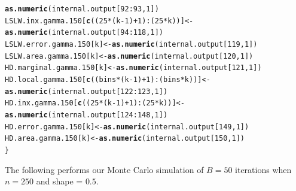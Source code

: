 \documentclass[11pt]{article}\usepackage[]{graphicx}\usepackage[]{color}
\makeatletter
\newcommand{\hlnum}[1]{\textcolor[rgb]{0.686,0.059,0.569}{#1}}%
\newcommand{\hlopt}[1]{\textcolor[rgb]{0,0,0}{#1}}%
\newcommand{\hlstd}[1]{\textcolor[rgb]{0.345,0.345,0.345}{#1}}%
\newcommand{\hlkwb}[1]{\textcolor[rgb]{0.69,0.353,0.396}{#1}}%
\newcommand{\hlkwd}[1]{\textcolor[rgb]{0.737,0.353,0.396}{\textbf{#1}}}%
\newenvironment{kframe}{%
 \def\at@end@of@kframe{}%
 \ifinner\ifhmode%
  \def\at@end@of@kframe{\end{minipage}}%
  \begin{minipage}{\columnwidth}%
 \fi\fi%
 \def\FrameCommand##1{\hskip\@totalleftmargin \hskip-\fboxsep
 \colorbox{shadecolor}{##1}\hskip-\fboxsep
     \hskip-\linewidth \hskip-\@totalleftmargin \hskip\columnwidth}%
 \MakeFramed {\advance\hsize-\width
   \@totalleftmargin\z@ \linewidth\hsize
   \@setminipage}}%
 {\par\unskip\endMakeFramed%
 \at@end@of@kframe}
\newenvironment{knitrout}{}{} %
\makeatother
\begin{document}
\begin{knitrout}
\begin{kframe}
\begin{alltt}
    \hlkwd{as.numeric}\hlstd{(internal.output[}\hlnum{92}\hlopt{:}\hlnum{93}\hlstd{,} \hlnum{1}\hlstd{])}
  \hlstd{LSLW.inx.gamma.150[}\hlkwd{c}\hlstd{((}\hlnum{25}\hlopt{*}\hlstd{(k}\hlopt{-}\hlnum{1}\hlstd{)}\hlopt{+}\hlnum{1}\hlstd{)}\hlopt{:}\hlstd{(}\hlnum{25}\hlopt{*}\hlstd{k))]} \hlkwb{<-}
    \hlkwd{as.numeric}\hlstd{(internal.output[}\hlnum{94}\hlopt{:}\hlnum{118}\hlstd{,} \hlnum{1}\hlstd{])}
  \hlstd{LSLW.error.gamma.150[k]} \hlkwb{<-} \hlkwd{as.numeric}\hlstd{(internal.output[}\hlnum{119}\hlstd{,} \hlnum{1}\hlstd{])}
  \hlstd{LSLW.area.gamma.150[k]} \hlkwb{<-} \hlkwd{as.numeric}\hlstd{(internal.output[}\hlnum{120}\hlstd{,} \hlnum{1}\hlstd{])}
  \hlstd{HD.marginal.gamma.150[k]} \hlkwb{<-} \hlkwd{as.numeric}\hlstd{(internal.output[}\hlnum{121}\hlstd{,} \hlnum{1}\hlstd{])}
  \hlstd{HD.local.gamma.150[}\hlkwd{c}\hlstd{((bins}\hlopt{*}\hlstd{(k}\hlopt{-}\hlnum{1}\hlstd{)}\hlopt{+}\hlnum{1}\hlstd{)}\hlopt{:}\hlstd{(bins}\hlopt{*}\hlstd{k))]} \hlkwb{<-}
    \hlkwd{as.numeric}\hlstd{(internal.output[}\hlnum{122}\hlopt{:}\hlnum{123}\hlstd{,} \hlnum{1}\hlstd{])}
  \hlstd{HD.inx.gamma.150[}\hlkwd{c}\hlstd{((}\hlnum{25}\hlopt{*}\hlstd{(k}\hlopt{-}\hlnum{1}\hlstd{)}\hlopt{+}\hlnum{1}\hlstd{)}\hlopt{:}\hlstd{(}\hlnum{25}\hlopt{*}\hlstd{k))]} \hlkwb{<-}
    \hlkwd{as.numeric}\hlstd{(internal.output[}\hlnum{124}\hlopt{:}\hlnum{148}\hlstd{,} \hlnum{1}\hlstd{])}
  \hlstd{HD.error.gamma.150[k]} \hlkwb{<-} \hlkwd{as.numeric}\hlstd{(internal.output[}\hlnum{149}\hlstd{,} \hlnum{1}\hlstd{])}
  \hlstd{HD.area.gamma.150[k]} \hlkwb{<-} \hlkwd{as.numeric}\hlstd{(internal.output[}\hlnum{150}\hlstd{,} \hlnum{1}\hlstd{])}
\hlstd{\}}
\end{alltt}


{\ttfamily\noindent\bfseries{}}\end{kframe}
\end{knitrout}


The following performs our Monte Carlo simulation of $B = 50$ iterations 
when $n = 250$ and shape = $0.5$.
\end{document}

